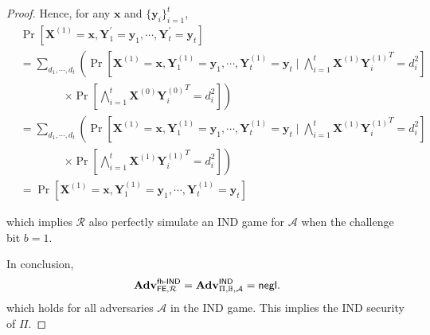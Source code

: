 \begin{proof}
Hence, for any $\mathbf{x}$ and $\{ \mathbf{y}_i \}_{i=1}^t$,
\begin{align*}
	& \Pr [\mathbf{X}^{(1)} = \mathbf{x}, \mathbf{Y}^\prime_1 = \mathbf{y}_1, \cdots, \mathbf{Y}^\prime_t = \mathbf{y}_t] \\
	&= \sum_{d_1, \cdots, d_t} \left( \Pr \left[\mathbf{X}^{(1)} = \mathbf{x}, \mathbf{Y}^{(1)}_1 = \mathbf{y}_1, \cdots, \mathbf{Y}^{(1)}_t = \mathbf{y}_t \mid \bigwedge_{i=1}^t \mathbf{X}^{(1)} {\mathbf{Y}^{(1)}_i}^T = d_i^2 \right] \right. \\
	&\qquad \qquad \left. \times \Pr \left[\bigwedge_{i=1}^t \mathbf{X}^{(0)} {\mathbf{Y}_i^{(0)}}^T = d_i^2 \right] \right) \\
	&= \sum_{d_1, \cdots, d_t} \left( \Pr \left[\mathbf{X}^{(1)} = \mathbf{x}, \mathbf{Y}^{(1)}_1 = \mathbf{y}_1, \cdots, \mathbf{Y}^{(1)}_t = \mathbf{y}_t \mid \bigwedge_{i=1}^t \mathbf{X}^{(1)} {\mathbf{Y}^{(1)}_i}^T = d_i^2 \right] \right. \\
	&\qquad \qquad \left. \times \Pr \left[\bigwedge_{i=1}^t \mathbf{X}^{(1)} {\mathbf{Y}_i^{(1)}}^T = d_i^2 \right] \right) \\
	&= \Pr[\mathbf{X}^{(1)} = \mathbf{x}, \mathbf{Y}^{(1)}_1 = \mathbf{y}_1, \cdots, \mathbf{Y}^{(1)}_t = \mathbf{y}_t ]
\end{align*}

\noindent which implies $\mathcal{R}$ also perfectly simulate an \textsf{IND} game for $\mathcal{A}$ when the challenge bit $b = 1$.

In conclusion, 
\[
	\mathbf{Adv}_{\textsf{FE}, \mathcal{R}}^\textsf{fh-IND} = \mathbf{Adv}_{\Pi, \mathbb{B}, \mathcal{A}}^\textsf{IND} = \mathsf{negl}.
\]
which holds for all adversaries $\mathcal{A}$ in the \textsf{IND} game. This implies the IND security of $\Pi$.


\end{proof}


